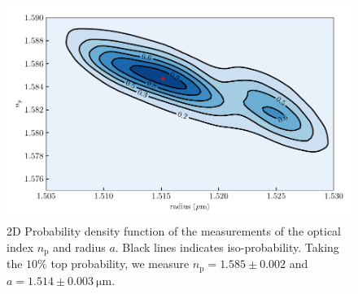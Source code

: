 \begin{figure}[h!]
	\centering
	\includegraphics{02_body/chapter2/images/KDErn.pdf}
	\caption{2D Probability density function of the measurements of the optical index $n_\mathrm{p}$ and radius $a$. Black lines indicates iso-probability. Taking the $10\% $ top probability, we measure $n_\mathrm{p} = 1.585 \pm 0.002$ and $a=1.514 \pm 0.003 ~ \mathrm{\mu m}$. }
\end{figure}